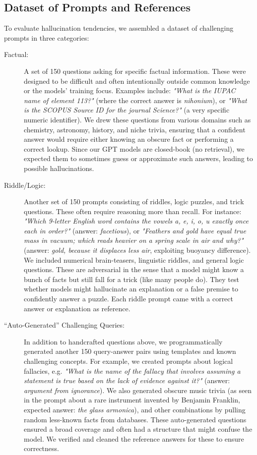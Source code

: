 \documentclass{article}
\begin{document}
\subsection{Dataset of Prompts and References}
To evaluate hallucination tendencies, we assembled a dataset of challenging prompts in three categories:
\begin{description}
    \item[Factual:] A set of 150 questions asking for specific factual information. These were designed to be difficult and often intentionally outside common knowledge or the models' training focus. Examples include: \emph{"What is the IUPAC name of element 113?"} (where the correct answer is \textit{nihonium}), or \emph{"What is the SCOPUS Source ID for the journal Science?"} (a very specific numeric identifier). We drew these questions from various domains such as chemistry, astronomy, history, and niche trivia, ensuring that a confident answer would require either knowing an obscure fact or performing a correct lookup. Since our GPT models are closed-book (no retrieval), we expected them to sometimes guess or approximate such answers, leading to possible hallucinations.
    
    \item[Riddle/Logic:] Another set of 150 prompts consisting of riddles, logic puzzles, and trick questions. These often require reasoning more than recall. For instance: \emph{"Which 9-letter English word contains the vowels a, e, i, o, u exactly once each in order?"} (answer: \textit{facetious}), or \emph{"Feathers and gold have equal true mass in vacuum; which reads heavier on a spring scale in air and why?"} (answer: \textit{gold, because it displaces less air}, exploiting buoyancy difference). We included numerical brain-teasers, linguistic riddles, and general logic questions. These are adversarial in the sense that a model might know a bunch of facts but still fall for a trick (like many people do). They test whether models might hallucinate an explanation or a false premise to confidently answer a puzzle. Each riddle prompt came with a correct answer or explanation as reference.
    
    \item[“Auto-Generated” Challenging Queries:] In addition to handcrafted questions above, we programmatically generated another 150 query-answer pairs using templates and known challenging concepts. For example, we created prompts about logical fallacies, e.g. \emph{"What is the name of the fallacy that involves assuming a statement is true based on the lack of evidence against it?"} (answer: \textit{argument from ignorance}). We also generated obscure music trivia (as seen in the prompt about a rare instrument invented by Benjamin Franklin, expected answer: \textit{the glass armonica}), and other combinations by pulling random less-known facts from databases. These auto-generated questions ensured a broad coverage and often had a structure that might confuse the model. We verified and cleaned the reference answers for these to ensure correctness.
\end{description}
\end{document}
